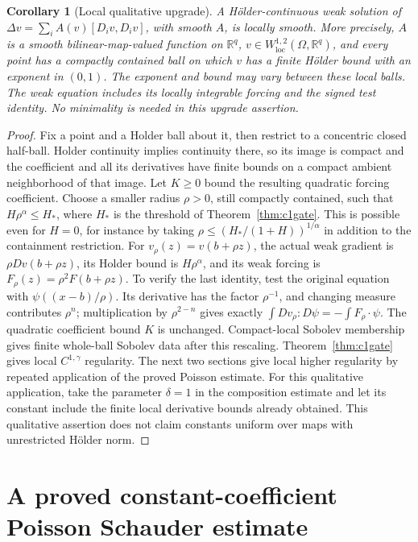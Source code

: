 \documentclass[11pt,a4paper]{article}
\numberwithin{equation}{section}
\newtheorem{corollary}[theorem]{Corollary}
\theoremstyle{definition}
\theoremstyle{remark}
\newcommand{\R}{\mathbb R}
\begin{document}
\begin{corollary}[Local qualitative upgrade]
\label{cor:qualitative}
A H\"older-continuous weak solution of
\(\Delta v=\sum_i A(v)[D_iv,D_iv]\), with smooth \(A\), is locally smooth.
More precisely, \(A\) is a smooth bilinear-map-valued function on
\(\R^q\), \(v\in W^{1,2}_{\mathrm{loc}}(\Omega,\R^q)\), and every
point has a compactly contained ball on which \(v\) has a finite H\"older
bound with an exponent in \((0,1)\). The exponent and bound may vary
between these local balls. The weak equation includes its locally
integrable forcing and the signed test identity.
No minimality is needed in this upgrade assertion.
\end{corollary}
\begin{proof}
Fix a point and a Holder ball about it, then restrict to a concentric
closed half-ball. Holder continuity implies continuity there, so its
image is compact and the coefficient and all its derivatives have finite
bounds on a compact ambient neighborhood of that image. Let \(K\ge0\)
bound the resulting quadratic forcing coefficient. Choose a smaller
radius \(\rho>0\), still compactly contained, such that
\(H\rho^\alpha\le H_*\), where \(H_*\) is the threshold of
Theorem~\ref{thm:c1gate}. This is possible even for \(H=0\), for instance
by taking \(\rho\le(H_*/(1+H))^{1/\alpha}\) in addition to the containment
restriction. For \(v_\rho(z)=v(b+\rho z)\), the actual weak gradient is
\(\rho Dv(b+\rho z)\), its Holder bound is \(H\rho^\alpha\), and its
weak forcing is \(F_\rho(z)=\rho^2F(b+\rho z)\). To verify the last
identity, test the original equation with
\(\psi((x-b)/\rho)\). Its derivative has the factor \(\rho^{-1}\),
and changing measure contributes \(\rho^n\); multiplication by
\(\rho^{2-n}\) gives exactly
\(\int Dv_\rho:D\psi=-\int F_\rho\cdot\psi\).
The quadratic coefficient bound \(K\) is unchanged. Compact-local
Sobolev membership gives finite whole-ball Sobolev data after this
rescaling. Theorem~\ref{thm:c1gate} gives local \(C^{1,\gamma}\)
regularity. The next two sections give local higher regularity by repeated
application of the proved Poisson estimate. For this qualitative application,
take the parameter \(\delta=1\) in the composition estimate and let its
constant include the finite local derivative bounds already obtained.
This qualitative assertion
does not claim constants uniform over maps with unrestricted H\"older norm.
\end{proof}

\section{A proved constant-coefficient Poisson Schauder estimate}
\label{sec:schauder}
\end{document}
